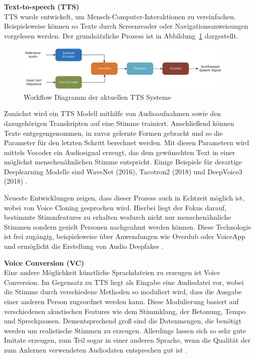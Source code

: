 \textbf{Text-to-speech (TTS)}\\
TTS wurde entwickelt, um Mensch-Computer-Interaktionen zu vereinfachen.
Beispielsweise können so Texte durch Screenreader oder Navigationsanweisungen vorgelesen werden.
Der grundsätzliche Prozess ist in Abbildung~\ref{fig:tts} \citep[][]{Masood2022} dargestellt.

\begin{figure}[htp]
\begin{center}
  \includegraphics[width=0.95\textwidth]{assets/TTS.png}
  \caption[labelInTOC]{Workflow Diagramm der aktuellen TTS Systeme \citep[][]{Masood2022}}
  \label{fig:tts}
\end{center}
\end{figure}

Zunächst wird ein TTS Modell mithilfe von Audioaufnahmen sowie den dazugehörigen Transkripten auf eine Stimme trainiert.
Anschließend können Texte entgegengenommen, in zuvor gelernte Formen gebracht und so die Parameter für den letzten Schritt berechnet werden.
Mit diesen Parametern wird mittels Vocoder ein Audiosignal erzeugt, das dem gewünschten Text in einer möglichst menschenähnlichen Stimme entspricht.
Einige Beispiele für derartige Deeplearning Modelle sind WaveNet (2016), Tacotron2 (2018) und DeepVoice3 (2018) \citep[vgl.][]{Almutairi2022}.

Neueste Entwicklungen zeigen, dass dieser Prozess auch in Echtzeit möglich ist, wobei von Voice Cloning gesprochen wird.
Hierbei liegt der Fokus darauf, bestimmte Stimmfeatures zu erhalten wodurch nicht nur menschenähnliche Stimmen sondern gezielt Personen nachgeahmt werden können.
Diese Technologie ist frei zugängig, beispielsweise über Anwendungen wie Overdub oder VoiceApp und ermöglicht die Erstellung von Audio Deepfakes \citep[][]{Masood2022}.

\textbf{Voice Conversion (VC)}\\
Eine andere Möglichkeit künstliche Sprachdateien zu erzeugen ist Voice Conversion.
Im Gegensatz zu TTS liegt als Eingabe eine Audiodatei vor, wobei die Stimme durch verschiedene Methoden so moduliert wird, dass die Ausgabe einer anderen Person zugeordnet werden kann.
Diese Modulierung basiert auf verschiedenen akustischen Features wie dem Stimmklang, der Betonung, Tempo und Sprechpausen.
Dementsprechend groß sind die Datenmengen, die benötigt werden um realistische Stimmen zu erzeugen.
Allerdings lassen sich so sehr gute Imitate erzeugen, zum Teil sogar in einer anderen Sprache, wenn die Qualität der zum Anlernen verwendeten Audiodaten entsprechen gut ist \citep[][]{Masood2022}.

